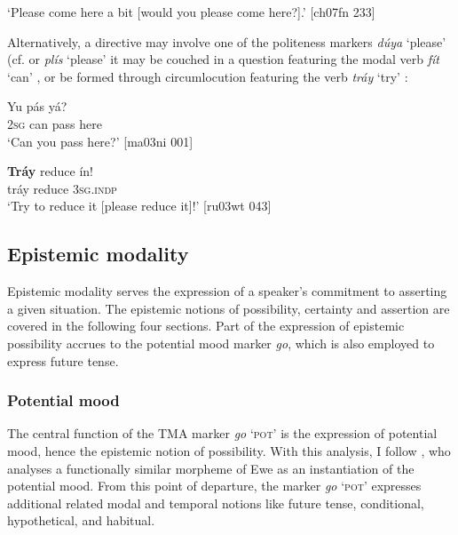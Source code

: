 \glt ‘Please come here a bit [would you please come here?].’ [ch07fn 233]
\z

Alternatively, a directive may involve one of the politeness markers \textit{dúya} ‘please’ (cf.  or \textit{plís} ‘please’ it may be couched in a question featuring the modal verb \textit{fít} ‘can’ , or be formed through circumlocution featuring the verb \textit{tráy} ‘try’ :


\ea%
    \label{ex:key:440}
    \gll Yu    pás  yá?\\
\textsc{2sg}  can  pass  here\\

\glt ‘Can you pass here?’ [ma03ni 001]
\z


\ea%
    \label{ex:key:441}
    \gll \textbf{Tráy}  reduce  ín!\\
tráy    reduce  \textsc{3sg.indp}\\

\glt ‘Try to reduce it [please reduce it]!’ [ru03wt 043]
\z

\subsection{Epistemic modality}

Epistemic modality serves the expression of a speaker’s commitment to asserting a given situation. The epistemic notions of possibility, certainty and assertion are covered in the following four sections. Part of the expression of epistemic possibility accrues to the potential mood marker \textit{go}, which is also employed to express future tense.

\subsubsection{Potential mood}\label{sec:6.7.4.1}

The central function of the TMA marker \textit{go} ‘\textsc{pot}’ is the expression of potential mood, hence the epistemic notion of possibility. With this analysis, I follow \citet{Essegbey2008}, who analyses a functionally similar\textit{} morpheme of Ewe as an instantiation of the potential mood. From this point of departure, the marker \textit{go} ‘\textsc{pot}’ expresses additional related modal and temporal notions like future tense, conditional, hypothetical, and habitual. 


